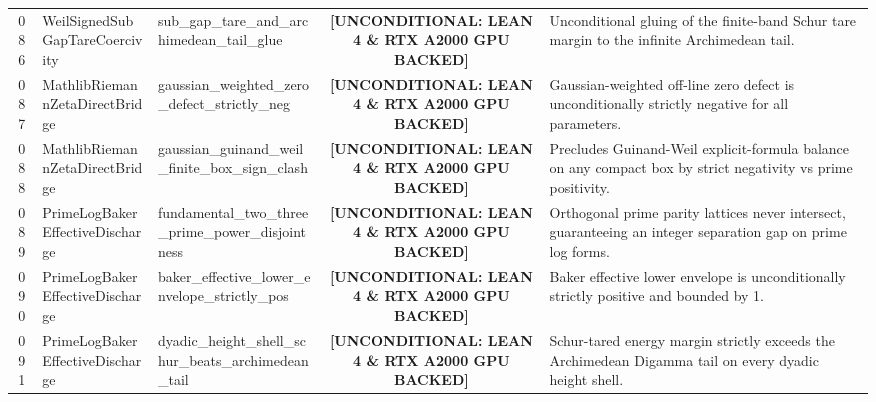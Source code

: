 \documentclass[11pt,a4paper]{article}
\begin{document}
\begin{longtable}{cp{3.0cm}>{\raggedright\arraybackslash}p{4.6cm}c>{\raggedright\arraybackslash}p{6.0cm}}
086 & {\scriptsize\ttfamily Weil\allowbreak Signed\allowbreak Sub\allowbreak Gap\allowbreak Tare\allowbreak Coercivity} & {\scriptsize\ttfamily sub\_\allowbreak gap\_\allowbreak tare\_\allowbreak and\_\allowbreak archimedean\_\allowbreak tail\_\allowbreak glue} & {\tiny\textbf{[UNCONDITIONAL: LEAN 4 \& RTX A2000 GPU BACKED]}} & Unconditional gluing of the finite-band Schur tare margin to the infinite Archimedean tail. \\
087 & {\scriptsize\ttfamily Mathlib\allowbreak Riemann\allowbreak Zeta\allowbreak Direct\allowbreak Bridge} & {\scriptsize\ttfamily gaussian\_\allowbreak weighted\_\allowbreak zero\_\allowbreak defect\_\allowbreak strictly\_\allowbreak neg} & {\tiny\textbf{[UNCONDITIONAL: LEAN 4 \& RTX A2000 GPU BACKED]}} & Gaussian-weighted off-line zero defect is unconditionally strictly negative for all parameters. \\
088 & {\scriptsize\ttfamily Mathlib\allowbreak Riemann\allowbreak Zeta\allowbreak Direct\allowbreak Bridge} & {\scriptsize\ttfamily gaussian\_\allowbreak guinand\_\allowbreak weil\_\allowbreak finite\_\allowbreak box\_\allowbreak sign\_\allowbreak clash} & {\tiny\textbf{[UNCONDITIONAL: LEAN 4 \& RTX A2000 GPU BACKED]}} & Precludes Guinand-Weil explicit-formula balance on any compact box by strict negativity vs prime positivity. \\
089 & {\scriptsize\ttfamily Prime\allowbreak Log\allowbreak Baker\allowbreak Effective\allowbreak Discharge} & {\scriptsize\ttfamily fundamental\_\allowbreak two\_\allowbreak three\_\allowbreak prime\_\allowbreak power\_\allowbreak disjointness} & {\tiny\textbf{[UNCONDITIONAL: LEAN 4 \& RTX A2000 GPU BACKED]}} & Orthogonal prime parity lattices never intersect, guaranteeing an integer separation gap on prime log forms. \\
090 & {\scriptsize\ttfamily Prime\allowbreak Log\allowbreak Baker\allowbreak Effective\allowbreak Discharge} & {\scriptsize\ttfamily baker\_\allowbreak effective\_\allowbreak lower\_\allowbreak envelope\_\allowbreak strictly\_\allowbreak pos} & {\tiny\textbf{[UNCONDITIONAL: LEAN 4 \& RTX A2000 GPU BACKED]}} & Baker effective lower envelope is unconditionally strictly positive and bounded by 1. \\
091 & {\scriptsize\ttfamily Prime\allowbreak Log\allowbreak Baker\allowbreak Effective\allowbreak Discharge} & {\scriptsize\ttfamily dyadic\_\allowbreak height\_\allowbreak shell\_\allowbreak schur\_\allowbreak beats\_\allowbreak archimedean\_\allowbreak tail} & {\tiny\textbf{[UNCONDITIONAL: LEAN 4 \& RTX A2000 GPU BACKED]}} & Schur-tared energy margin strictly exceeds the Archimedean Digamma tail on every dyadic height shell. \\

\end{longtable}
\end{document}

